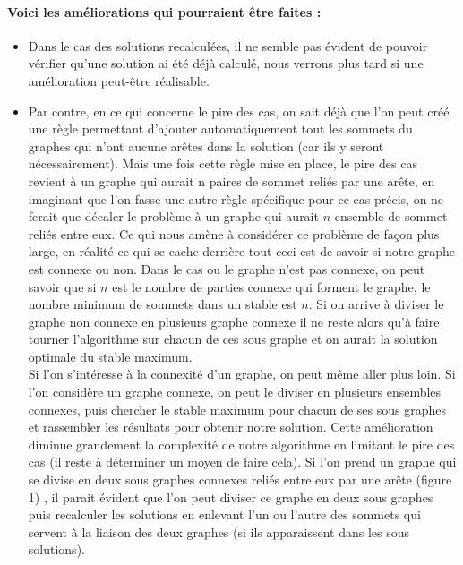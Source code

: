 \documentclass[10pt,a4paper]{article}
\begin{document}
\paragraph{Voici les améliorations qui pourraient être faites : }

\begin{itemize}
\item Dans le cas des solutions recalculées, il ne semble pas évident de pouvoir vérifier qu'une solution ai été déjà calculé, nous verrons plus tard si une amélioration peut-être réalisable.
\\
\item Par contre, en ce qui concerne le pire des cas, on sait déjà que l'on peut créé une règle permettant d'ajouter automatiquement tout les sommets du graphes qui n'ont aucune arêtes dans la solution (car ils y seront nécessairement). Mais une fois cette règle mise en place, le pire des cas revient à un graphe qui aurait n paires de sommet reliés par une arête, en imaginant que l'on fasse une autre règle spécifique pour ce cas précis, on ne ferait que décaler le problème à un graphe qui aurait $n$ ensemble de sommet reliés entre eux. Ce qui nous amène à considérer ce problème de façon plus large, en réalité ce qui se cache derrière tout ceci est de savoir si notre graphe est connexe ou non. Dans le cas ou le graphe n'est pas connexe, on peut savoir que si $n$ est le nombre de parties connexe qui forment le graphe, le nombre minimum de sommets dans un stable est $n$. Si on arrive à diviser le graphe non connexe en plusieurs graphe connexe il ne reste alors qu'à faire tourner l'algorithme sur chacun de ces sous graphe et on aurait la solution optimale du stable maximum.
\\
Si l'on s'intéresse à la connexité d'un graphe, on peut même aller plus loin. Si l'on considère un graphe  connexe, on peut le diviser en plusieurs ensembles connexes, puis chercher le stable maximum pour chacun de ses sous graphes et rassembler les résultats pour obtenir notre solution. Cette amélioration diminue grandement la complexité de notre algorithme en limitant le pire des cas (il reste à déterminer un moyen de faire cela). Si l'on prend un graphe qui se divise en deux sous graphes connexes reliés entre eux par une arête (figure 1) , il parait évident que l'on peut diviser ce graphe en deux sous graphes puis recalculer les solutions en enlevant l'un ou l'autre des sommets qui servent à la liaison des deux graphes (si ils apparaissent dans les sous solutions).
\\


\end{itemize}
\end{document}
